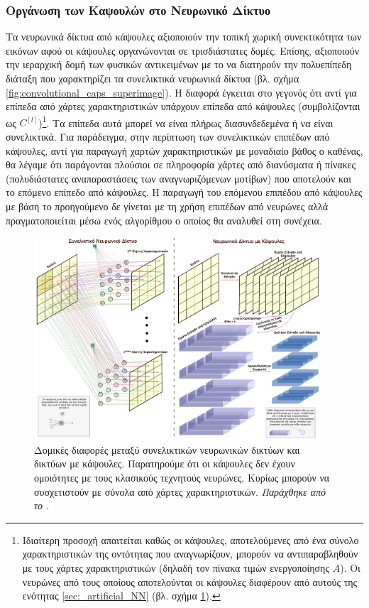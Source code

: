 \subsubsection{Οργάνωση των Καψουλών στο Νευρωνικό Δίκτυο}

Τα νευρωνικά δίκτυα από κάψουλες αξιοποιούν την τοπική χωρική συνεκτικότητα των εικόνων αφού οι κάψουλες οργανώνονται σε τρισδιάστατες δομές. Επίσης, αξιοποιούν την ιεραρχική δομή των φυσικών αντικειμένων με το να διατηρούν την πολυεπίπεδη διάταξη που χαρακτηρίζει τα συνελικτικά νευρωνικά δίκτυα (βλ. σχήμα \ref{fig:convolutional_caps_superimage}). Η διαφορά έγκειται στο γεγονός ότι αντί για επίπεδα από χάρτες χαρακτηριστικών υπάρχουν επίπεδα από κάψουλες (συμβολίζονται ως $C^{[l]}$)\footnote{Ιδιαίτερη προσοχή απαιτείται καθώς οι κάψουλες, αποτελούμενες από ένα σύνολο χαρακτηριστικών της οντότητας που αναγνωρίζουν, μπορούν να αντιπαραβληθούν με τους χάρτες χαρακτηριστικών (δηλαδή τον πίνακα τιμών ενεργοποίησης $A$). Οι νευρώνες από τους οποίους αποτελούνται οι κάψουλες διαφέρουν από αυτούς της ενότητας \ref{sec:_artificial_NN} (βλ. σχήμα \ref{fig:conv_vs_caps_superimage}).}. Τα επίπεδα αυτά μπορεί να είναι πλήρως διασυνδεδεμένα ή να είναι συνελικτικά. Για παράδειγμα, στην περίπτωση των συνελικτικών επιπέδων από κάψουλες, αντί για παραγωγή χαρτών χαρακτηριστικών με μοναδιαίο βάθος ο καθένας, θα λέγαμε ότι παράγονται πλούσιοι σε πληροφορία χάρτες από διανύσματα ή πίνακες (πολυδιάστατες αναπαραστάσεις των αναγνωριζόμενων μοτίβων) που αποτελούν και το επόμενο επίπεδο από κάψουλες. Η παραγωγή του επόμενου επιπέδου από κάψουλες με βάση το προηγούμενο δε γίνεται με τη χρήση επιπέδων από νευρώνες αλλά πραγματοποιείται μέσω ενός αλγορίθμου  ο οποίος θα αναλυθεί στη συνέχεια.\par

\begin{figure}[h]
  \centering
  \includegraphics[width=0.95\textwidth]{images/chapter theoritical background/convolve_vs_capsule_gr.pdf}
  \caption{Δομικές διαφορές μεταξύ συνελικτικών νευρωνικών δικτύων και δικτύων με κάψουλες. Παρατηρούμε ότι οι κάψουλες δεν έχουν ομοιότητες με τους κλασικούς τεχνητούς νευρώνες. Κυρίως μπορούν να συσχετιστούν με σύνολα από χάρτες χαρακτηριστικών. \textit{Παράχθηκε από το \href{https://inkscape.org/}{}}.}
  \label{fig:conv_vs_caps_superimage}
\end{figure}

